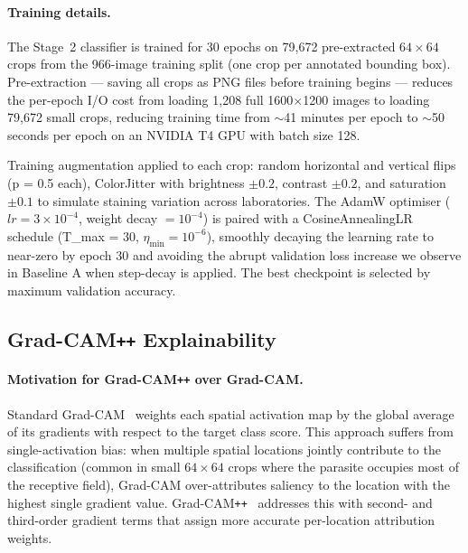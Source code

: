 \documentclass[review,12pt]{elsarticle}
\begin{document}
\paragraph{Training details.}
The Stage~2 classifier is trained for 30 epochs on 79,672 pre-extracted
$64\times 64$ crops from the 966-image training split (one crop per
annotated bounding box). Pre-extraction --- saving all crops as PNG files
before training begins --- reduces the per-epoch I/O cost from loading
1,208 full 1600$\times$1200 images to loading 79,672 small crops,
reducing training time from $\sim$41 minutes per epoch to $\sim$50
seconds per epoch on an NVIDIA T4 GPU with batch size 128.

Training augmentation applied to each crop: random horizontal and vertical
flips (p = 0.5 each), ColorJitter with brightness $\pm 0.2$, contrast
$\pm 0.2$, and saturation $\pm 0.1$ to simulate staining variation across
laboratories. The AdamW optimiser ($lr = 3 \times 10^{-4}$,
weight decay $= 10^{-4}$) is paired with a CosineAnnealingLR schedule
(T\_max = 30, $\eta_{\min} = 10^{-6}$), smoothly decaying the learning
rate to near-zero by epoch 30 and avoiding the abrupt validation loss
increase we observe in Baseline A when step-decay is applied. The best
checkpoint is selected by maximum validation accuracy.

\subsection{Grad-CAM\texttt{++} Explainability}
\label{ssec:gradcam}

\paragraph{Motivation for Grad-CAM\texttt{++} over Grad-CAM.}
Standard Grad-CAM~\cite{selvaraju2017} weights each spatial activation
map by the global average of its gradients with respect to the target class
score. This approach suffers from single-activation bias: when multiple
spatial locations jointly contribute to the classification (common in
small $64 \times 64$ crops where the parasite occupies most of the
receptive field), Grad-CAM over-attributes saliency to the location with
the highest single gradient value. Grad-CAM\texttt{++}~\cite{chattopadhyay2018}
addresses this with second- and third-order gradient terms that assign
more accurate per-location attribution weights.
\end{document}
